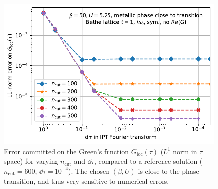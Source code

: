 \documentclass[reprint,amsmath,amssymb,aps,pra]{revtex4-2}
\begin{document}
\begin{figure}[H]
\includegraphics[width=\columnwidth]{Gloc-vs-Glocref.pdf}
\caption{\label{fig:conv-dtau-ncut}Error committed on the Green's function $G_\text{loc}(\tau)$ ($L^1$ norm in $\tau$ space) for varying $n_\text{cut}$ and $\dd{\tau}$, compared to a reference solution ($n_\text{cut}=600$, $\dd{\tau}=10^{-4}$). The chosen $(\beta,U)$ is close to the phase transition, and thus very sensitive to numerical errors.}
\end{figure}
\end{document}
